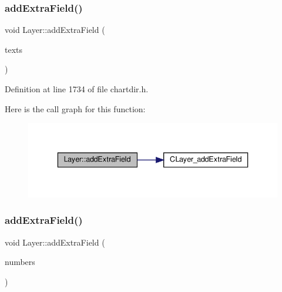 \subsubsection{\texorpdfstring{add\+Extra\+Field()}{addExtraField()}\hspace{0.1cm}{\footnotesize\ttfamily [1/2]}}
{\footnotesize\ttfamily void Layer\+::add\+Extra\+Field (\begin{DoxyParamCaption}\item[{\hyperlink{class_string_array}{String\+Array}}]{texts }\end{DoxyParamCaption})\hspace{0.3cm}{\ttfamily [inline]}}



Definition at line 1734 of file chartdir.\+h.

Here is the call graph for this function\+:
\nopagebreak
\begin{figure}[H]
\begin{center}
\leavevmode
\includegraphics[width=336pt]{class_layer_a6f22ae8bd97228303a91ad9efe6ea3da_cgraph}
\end{center}
\end{figure}
\mbox{\label{class_layer_a309be6ac81b9f7592697fa1ce4a86b71}} 
\subsubsection{\texorpdfstring{add\+Extra\+Field()}{addExtraField()}\hspace{0.1cm}{\footnotesize\ttfamily [2/2]}}
{\footnotesize\ttfamily void Layer\+::add\+Extra\+Field (\begin{DoxyParamCaption}\item[{\hyperlink{class_double_array}{Double\+Array}}]{numbers }\end{DoxyParamCaption})\hspace{0.3cm}{\ttfamily [inline]}}



